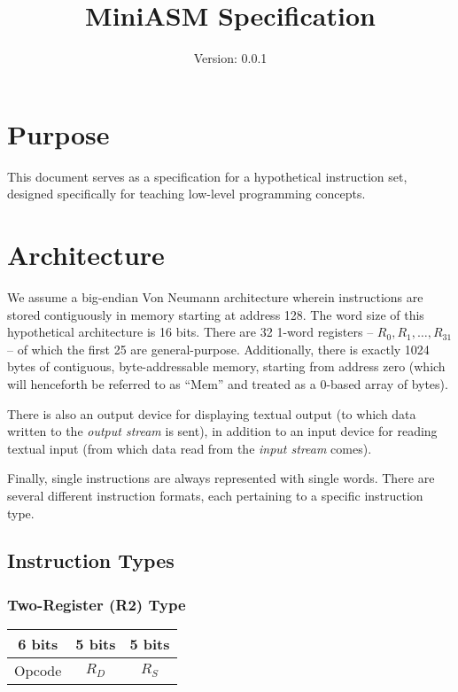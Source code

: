 \documentclass[12pt]{scrartcl}
\begin{document}
\title{MiniASM Specification}
\subtitle{Version: 0.0.1}
\date{}

\maketitle

\tableofcontents
\newpage

\section{Purpose}
This document serves as a specification for a hypothetical instruction set, designed specifically for teaching low-level programming concepts.


\section{Architecture}

We assume a big-endian Von Neumann architecture wherein instructions are stored contiguously in memory starting at address 128. The word size of this hypothetical architecture is 16 bits. There are 32 1-word registers -- $R_0, R_1, \ldots, R_{31}$ -- of which the first 25 are general-purpose. Additionally, there is exactly 1024 bytes of contiguous, byte-addressable memory, starting from address zero (which will henceforth be referred to as ``Mem'' and treated as a 0-based array of bytes).

There is also an output device for displaying textual output (to which data written to the \textit{output stream} is sent), in addition to an input device for reading textual input (from which data read from the \textit{input stream} comes).

Finally, single instructions are always represented with single words. There are several different instruction formats, each pertaining to a specific instruction type.


\subsection{Instruction Types}

\subsubsection{Two-Register (R2) Type}

\begin{center}
  \begin{tabular}{|c|c|c|}
    \hline
    \textbf{6 bits} & \textbf{5 bits} & \textbf{5 bits} \\
    \hline
    Opcode & $R_D$ & $R_S$ \\
    \hline
  \end{tabular}
\end{center}
\end{document}
